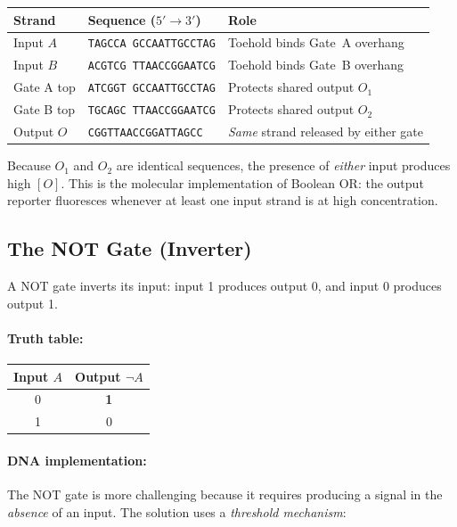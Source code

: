 \begin{center}
\renewcommand{\arraystretch}{1.15}
\begin{tabular}{lll}
\toprule
\textbf{Strand} & \textbf{Sequence ($5' \to 3'$)} & \textbf{Role} \\
\midrule
Input $A$ & \texttt{TAGCCA\,GCCAATTGCCTAG} & Toehold binds Gate~A overhang \\
Input $B$ & \texttt{ACGTCG\,TTAACCGGAATCG} & Toehold binds Gate~B overhang \\
Gate A top & \texttt{ATCGGT\,GCCAATTGCCTAG} & Protects shared output $O_1$ \\
Gate B top & \texttt{TGCAGC\,TTAACCGGAATCG} & Protects shared output $O_2$ \\
Output $O$ & \texttt{CGGTTAACCGGATTAGCC} & \emph{Same} strand released by either gate \\
\bottomrule
\end{tabular}
\end{center}

Because $O_1$ and $O_2$ are identical sequences, the presence of \emph{either} input produces high $[O]$.  This is the molecular implementation of Boolean OR: the output reporter fluoresces whenever at least one input strand is at high concentration.

\subsection{The NOT Gate (Inverter)}

A NOT gate inverts its input: input 1 produces output 0, and input 0 produces output 1.

\paragraph{Truth table:}
\begin{center}
\renewcommand{\arraystretch}{1.15}
\begin{tabular}{c|c}
\toprule
\textbf{Input $A$} & \textbf{Output $\neg A$} \\
\midrule
0 & \textbf{1} \\
1 & 0 \\
\bottomrule
\end{tabular}
\end{center}

\paragraph{DNA implementation:}
The NOT gate is more challenging because it requires producing a signal in the \emph{absence} of an input. The solution uses a \emph{threshold mechanism}:

